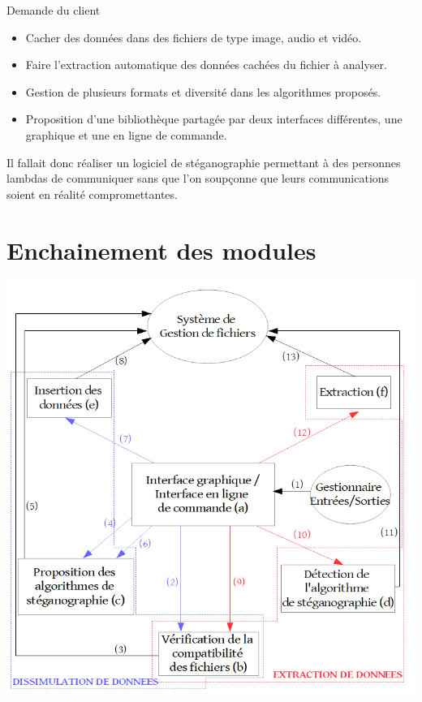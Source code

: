 \documentclass{beamer}
\begin{document}
  \begin{frame}
   \begin{block}{Demande du client}
	\begin{itemize}
	[circle]
    \item Cacher des données dans des fichiers
        de type image, audio et vidéo. 
    \item Faire l'extraction automatique des données cachées du 
        fichier à analyser.
    \item Gestion de plusieurs formats et diversité dans les algorithmes proposés.
    \item Proposition d'une bibliothèque partagée par
        deux interfaces différentes, une graphique et une en ligne de commande.
	\end{itemize}
	\end{block}

	Il fallait donc réaliser un logiciel de stéganographie permettant à des
	personnes lambdas de communiquer sans que l'on soupçonne que leurs
	communications soient en réalité compromettantes. 

  \end{frame}
  
  \section{Enchainement des modules}
  \begin{frame}
  \hspace{1.5cm}
  \includegraphics[scale=0.25]{pictures/organigramme_extraction.png}
  \end{frame}
  
\end{document}

